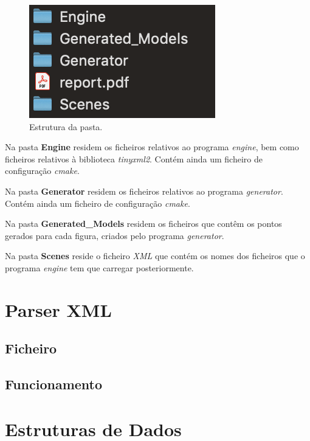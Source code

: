 \documentclass[a4paper]{article}
\begin{document}
\begin{figure}[H]
\centering
\includegraphics[scale=1.0]{estrutura.png}
\caption{Estrutura da pasta.}
\label{img:estrutura}
\end{figure}

Na pasta \textbf{Engine} residem os ficheiros relativos ao programa \emph{engine}, bem como ficheiros relativos à biblioteca \emph{tinyxml2}. Contém ainda um ficheiro de configuração \emph{cmake}.

Na pasta \textbf{Generator} residem os ficheiros relativos ao programa \emph{generator}. Contém ainda um ficheiro de configuração \emph{cmake}.

Na pasta \textbf{Generated\_Models} residem os ficheiros que contêm os pontos gerados para cada figura, criados pelo programa \emph{generator}.

Na pasta \textbf{Scenes} reside o ficheiro \emph{XML} que contém os nomes dos ficheiros que o programa \emph{engine} tem que carregar posteriormente.


\newpage

\section{Parser XML}
\label{sec:parser}

\subsection{Ficheiro}
\label{sec:ficheiro}

\subsection{Funcionamento}
\label{sec:funcionamento}


\newpage

\section{Estruturas de Dados}
\label{sec:estruturas}
\end{document}
